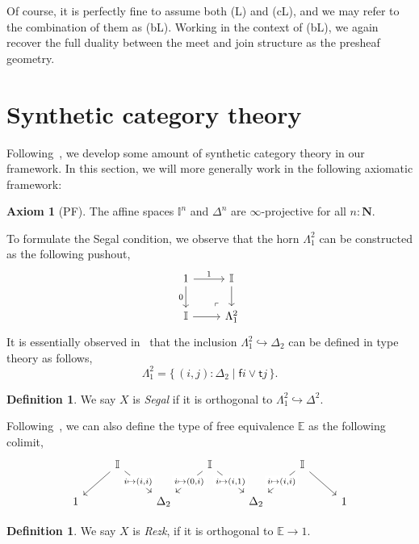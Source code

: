 \documentclass[12pt]{amsart}
\theoremstyle{definition}
\newtheorem{definition}[theorem]{Definition}
\newtheorem{axiom}{Axiom}
\newcommand{\mb}[1]{\mathbf{#1}}
\newcommand{\mbb}[1]{\mathbb{#1}}
\newcommand{\I}{\mbb I}
\newcommand{\ms}[1]{\mathsf{#1}}
\newcommand{\scomp}[2]{\{\,#1\mid#2\,\}}
\newcommand{\hook}{\hookrightarrow}
\newcommand{\N}{\mb N}
\begin{document}
Of course, it is perfectly fine to assume both (L) and (cL), and we may refer to the combination of them as (bL). Working in the context of (bL), we again recover the full duality between the meet and join structure as the presheaf geometry.

\section{Synthetic category theory}

Following~\cite{gratzer2024directed}, we develop some amount of synthetic category theory in our framework. In this section, we will more generally work in the following axiomatic framework:

\begin{axiom}[PF]
  The affine spaces $\I^n$ and $\Delta^n$ are $\infty$-projective for all $n:\N$.
\end{axiom}


To formulate the Segal condition, we observe that the horn $\Lambda^2_1$ can be constructed as the following pushout,
\[
  \begin{tikzcd}
    1 \ar[d, "0"'] \ar[r, "1"] & \I \ar[d] \\
    \I \ar[r] & \Lambda^2_1
    \arrow["\lrcorner"{anchor=center, pos=0.125, rotate=180}, draw=none, from=2-2, to=1-1]
  \end{tikzcd}
\]
It is essentially observed in~\cite{riehl2017type} that the inclusion $\Lambda^2_1 \hook \Delta_2$ can be defined in type theory as follows,
\[ \Lambda^2_1 = \scomp{(i,j) : \Delta_2}{\ms fi \vee \ms tj}. \]

\begin{definition}
  We say $X$ is \emph{Segal} if it is orthogonal to $\Lambda^2_1 \hook \Delta^2$.
\end{definition}

Following~\cite{buchholtz2021synthetic}, we can also define the type of free equivalence $\mbb E$ as the following colimit,
\[
\begin{tikzcd}
	& \I && \I && \I \\
	1 && {\Delta_2} && {\Delta_2} && 1
	\arrow[from=1-2, to=2-1]
	\arrow["{i \mapsto (i,i) }"{description}, from=1-2, to=2-3]
	\arrow["{i \mapsto (0,i)}"{description}, from=1-4, to=2-3]
	\arrow["{i \mapsto (i,1)}"{description}, from=1-4, to=2-5]
	\arrow["{i \mapsto (i,i)}"{description}, from=1-6, to=2-5]
	\arrow[from=1-6, to=2-7]
\end{tikzcd}
\]

\begin{definition}
  We say $X$ is \emph{Rezk}, if it is orthogonal to $\mbb E \to 1$.
\end{definition}
\end{document}
